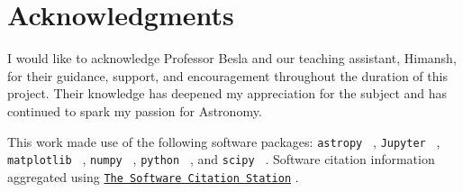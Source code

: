 \documentclass[fleqn,usenatbib]{mnras}
\begin{document}
\section{Acknowledgments}
I would like to acknowledge Professor Besla and our teaching assistant, Himansh, for their guidance, support, and encouragement throughout the duration of this project. Their knowledge has deepened my appreciation for the subject and has continued to spark my passion for Astronomy. 

This work made use of the following software packages: \texttt{astropy } \citep{astropy:2013, astropy:2018, astropy:2022}, \texttt{Jupyter } \citep{2007CSE.....9c..21P, kluyver2016jupyter}, \texttt{matplotlib } \citep{Hunter:2007}, \texttt{numpy } \citep{numpy}, \texttt{python } \citep{python}, and \texttt{scipy } \citep{2020SciPy-NMeth, scipy_14880408}.  Software citation information aggregated using \texttt{\href{https://www.tomwagg.com/software-citation-station/}{The Software Citation Station}} \citep{software-citation-station-paper, software-citation-station-zenodo}.

\begingroup 

\nocite{*} 




\endgroup

\bsp	%
\label{lastpage}
\end{document}
